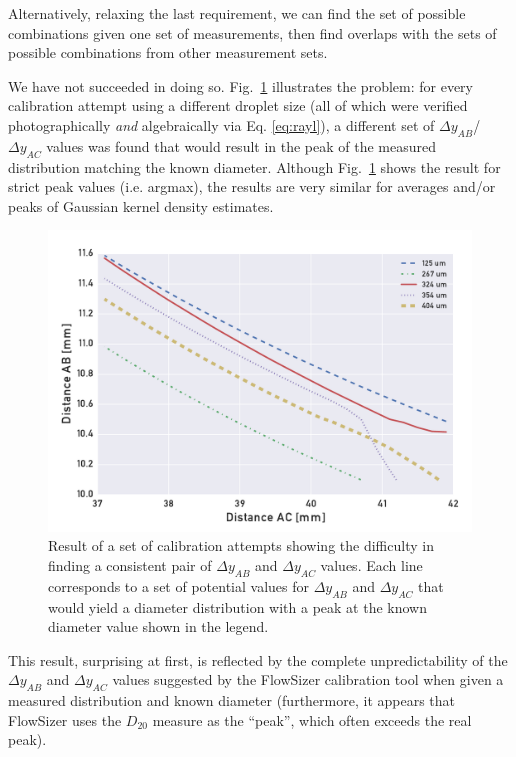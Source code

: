 \documentclass[11.5pt,oneside]{book}
\newcommand*{\figref}[1]{Fig.~\ref{#1}}
\begin{document}
Alternatively, relaxing the last requirement, we can find the set of
possible combinations given one set of measurements, then find overlaps
with the sets of possible combinations from other measurement sets.

We have not succeeded in doing so. \figref{fig:pdpa-zerorelations} illustrates
the problem: for every calibration attempt using a different droplet size (all
of which were verified photographically \emph{and} algebraically via Eq.
\eqref{eq:rayl}), a different set of $\Delta y_{AB}$/$\Delta y_{AC}$ values was
found that would result in the peak of the measured distribution matching the
known diameter. Although \figref{fig:pdpa-zerorelations} shows the result for
strict peak values (i.e. argmax), the results are very similar for averages
and/or peaks of Gaussian kernel density estimates.

\begin{figure}
    \centering
    \includegraphics[width=\textwidth]{img/pdpa/all-coinc-AB-AC-zerorelations.pdf}
    \caption{Result of a set of calibration attempts showing the difficulty in
            finding a consistent pair of $\Delta y_{AB}$ and $\Delta y_{AC}$
            values. Each line corresponds to a set of potential values for
    $\Delta y_{AB}$ and $\Delta y_{AC}$ that would yield a diameter distribution
    with a peak at the known diameter value shown in the legend.
    \label{fig:pdpa-zerorelations}}
\end{figure}

This result, surprising at first, is reflected by the complete unpredictability
of the $\Delta y_{AB}$ and $\Delta y_{AC}$ values suggested by the FlowSizer
calibration tool when given a measured distribution and known diameter
(furthermore, it appears that FlowSizer uses the $D_{20}$ measure as the
``peak'', which often exceeds the real peak).
\end{document}

